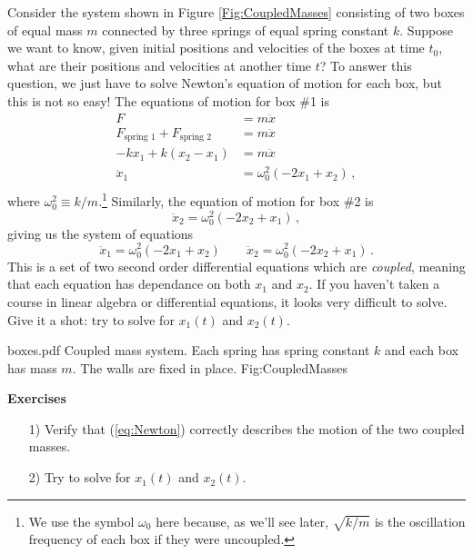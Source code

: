 Consider the system shown in Figure \ref{Fig:CoupledMasses} consisting of two boxes of equal mass $m$ connected by three springs of equal spring constant $k$.
Suppose we want to know, given initial positions and velocities of the boxes at time $t_{0}$, what are their positions and velocities at another time $t$?
To answer this question,  we just have to solve Newton's equation of motion for each box, but this is not so easy!
The equations of motion for box \#1 is
\begin{align*}
F &= m \ddot{x} \\
F_\text{spring 1} + F_\text{spring 2} &= m \ddot{x} \\
-k x_1 + k (x_2 - x_1) &= m \ddot{x} \\
\ddot{x}_1 &= \omega_0^2 (-2 x_1 + x_2) \, , \\
\end{align*}
where $\omega_0^2 \equiv k/m$.\footnote{We use the symbol $\omega_0$ here because, as we'll see later, $\sqrt{k/m}$ is the oscillation frequency of each box if they were uncoupled.}
Similarly, the equation of motion for box \#2 is
\begin{equation*}
\ddot{x}_2 = \omega_0^2 (-2 x_2 + x_1) \, ,
\end{equation*}
giving us the system of equations
\begin{equation} \label{eq:Newton}
\ddot{x}_{1} = \omega_{0}^{2} (-2x_{1} + x_{2}) \qquad
\ddot{x}_{2} = \omega_{0}^{2} (-2x_{2} + x_{1}) \, .
\end{equation}
This is a set of two second order differential equations which are \textit{coupled}, meaning that each equation has dependance on both $x_1$ and $x_2$.
If you haven't taken a course in linear algebra or differential equations, it looks very difficult to solve.
Give it a shot: try to solve for $x_{1}(t)$ and $x_{2}(t)$.

\quickfig
{\columnwidth}
{boxes.pdf}
{Coupled mass system.
Each spring has spring constant $k$ and each box has mass $m$.
The walls are fixed in place.}
{Fig:CoupledMasses}

\begin{flushleft}\textbf{Exercises}\end{flushleft} %
\begin{itemize}\item[1)] Verify that (\ref{eq:Newton}) correctly describes the motion of the two coupled masses.\item[2)] Try to solve for $x_{1}(t)$ and $x_{2}(t)$.\end{itemize}

